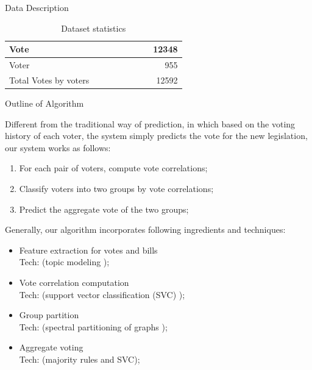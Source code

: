 \documentclass[final]{beamer}
\newlength{\onecolwid}
\begin{document}
\begin{frame}[t]
\begin{columns}[t]
\begin{column}{\onecolwid}
\begin{block}{Data Description}
     \begin{table}
         \centering
         \begin{tabular}{|l|r|}
             \hline
             Vote & 12348 \\
             \hline
             Voter & 955 \\
             \hline
             Total Votes by voters~~~~~~~~~~~~~ & 12592 \\ 
             \hline
         \end{tabular}
         \caption{Dataset statistics}
     \end{table}
\end{block}

\begin{block}{Outline of Algorithm}

Different from the traditional way of prediction, in which based on the voting history of each voter, the system simply predicts the vote for the new legislation, our system works as follows:     \begin{enumerate}         
        \item For each pair of voters, compute vote correlations;
        \item Classify voters into two groups by vote correlations;
        \item Predict the aggregate vote of the two groups;
    \end{enumerate}

Generally, our algorithm incorporates following ingredients and techniques:
\begin{itemize}
    \item Feature extraction for votes and bills \\ Tech: (topic modeling \cite{graham2012getting});
    \item Vote correlation computation \\ Tech: (support vector classification (SVC) \cite{hsu2003practical});
    \item Group partition \\ Tech: (spectral partitioning of graphs \cite{mcsherry2001spectral,kumar2010clustering});
    \item Aggregate voting \\ Tech: (majority rules \cite{mcgann2004tyranny} and SVC);
\end{itemize}

\end{block}



\end{column}
\end{columns}
\end{frame}
\end{document}
